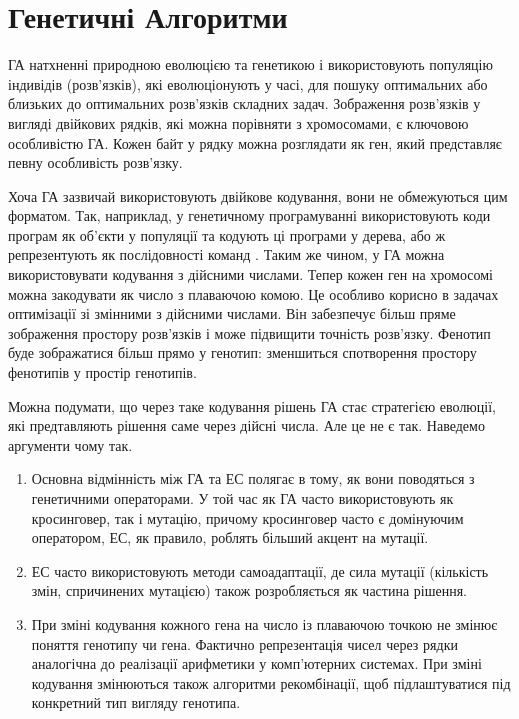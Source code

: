 \section{Генетичні Алгоритми}

ГА натхненні природною еволюцією та генетикою і використовують 
популяцію індивідів (розв'язків), які еволюціонують у часі, 
для пошуку оптимальних або близьких до оптимальних розв'язків складних задач. 
Зображення розв'язків у вигляді двійкових рядків, 
які можна порівняти з хромосомами, є ключовою особливістю ГА. 
Кожен байт у рядку можна розглядати як ген, який представляє 
певну особливість розв'язку.

Хоча ГА зазвичай використовують двійкове кодування, 
вони не обмежуються цим форматом. 
Так, наприклад, у генетичному програмуванні використовують
коди програм як об'єкти у популяції та кодують ці програми
у дерева, або ж репрезентують як послідовності команд 
\cite{slowik_evolutionary_2020, luke_essentials_2013}.
Таким же чином, у ГА можна використовувати кодування з дійсними числами. 
Тепер кожен ген на хромосомі можна закодувати як число з плаваючою комою.
Це особливо корисно в задачах оптимізації зі змінними з дійсними числами. 
Він забезпечує більш пряме зображення простору розв'язків 
і може підвищити точність розв'язку. 
Фенотип буде зображатися більш прямо у генотип:
зменшиться спотворення простору фенотипів у простір генотипів.

Можна подумати, що через таке кодування рішень ГА стає
стратегією еволюції, які предтавляють рішення саме через
дійсні числа.
Але це не є так. Наведемо аргументи чому так.
\begin{enumerate}
\item Основна відмінність між ГА та ЕС полягає в тому, 
  як вони поводяться з генетичними операторами. 
  У той час як ГА часто використовують як кросинговер, 
  так і мутацію, причому кросинговер часто є домінуючим оператором, 
  ЕС, як правило, роблять більший акцент на мутації. 
\item ЕС часто використовують методи самоадаптації, 
  де сила мутації (кількість змін, спричинених мутацією) 
  також розробляється як частина рішення.
\item При зміні кодування кожного гена на число із плаваючою точкою
  не змінює поняття генотипу чи гена.
  Фактично репрезентація чисел через рядки аналогічна
  до реалізації арифметики у комп'ютерних системах.
  При зміні кодування змінюються також алгоритми
  рекомбінації, щоб підлаштуватися під конкретний тип
  вигляду генотипа.
\end{enumerate}

